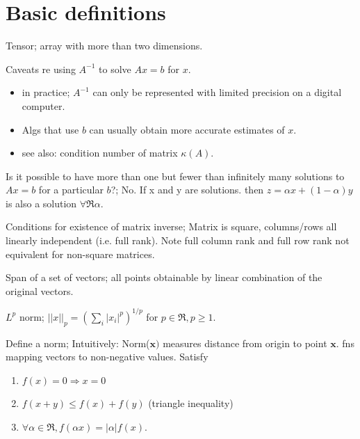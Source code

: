 \documentclass{article}
\begin{document}

\section{Basic definitions}

Tensor; array with more than two dimensions.

Caveats re using $A^{-1}$ to solve $Ax=b$ for $x$. \begin{itemize}
	\item in practice; $A^{-1}$ can only be represented with limited precision on a digital computer. \item Algs that use $b$ can usually obtain more accurate estimates of $x$.
	\item see also: condition number of matrix $\kappa(A)$.
\end{itemize}

Is it possible to have more than one but fewer than infinitely many solutions to $Ax=b$ for a particular $b$?; No. If x and y are solutions. then $z=\alpha x + (1-\alpha) y$ is also a solution $\forall \Re \alpha$.

Conditions for existence of matrix inverse; Matrix is square, columns/rows all linearly independent (i.e. full rank). \newline Note full column rank and full row rank not equivalent for non-square matrices.

Span of a set of vectors; all points obtainable by linear combination of the original vectors.

$L^p$ norm; $||x||_p=(\sum_i |x_i|^p)^{1/p}$ for $p\in\Re, p\geq 1$.

Define a norm; Intuitively: Norm($\mathbf{x})$ measures distance from origin to point $\mathbf{x}$. fns mapping vectors to non-negative values. Satisfy \begin{enumerate}
	\item $f(x)=0\Rightarrow x=0$
	\item $f(x+y)\leq f(x)+f(y)$ (triangle inequality)
	\item $\forall \alpha \in \Re, f(\alpha x) = |\alpha| f(x)$.
\end{enumerate}
\end{document}
